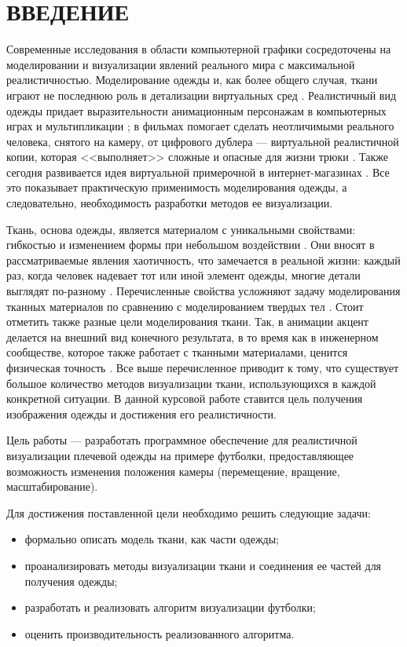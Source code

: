 \chapter*{ВВЕДЕНИЕ}

Современные исследования в области компьютерной графики сосредоточены на
моделировании и визуализации явлений реального мира с максимальной
реалистичностью. Моделирование одежды и, как более общего случая, ткани играют
не последнюю роль в детализации виртуальных сред \cite{bib01}.  Реалистичный вид
одежды придает выразительности анимационным персонажам в компьютерных играх и
мультипликации \cite{bib02}; в фильмах помогает сделать неотличимыми реального
человека, снятого на камеру, от цифрового дублера --- виртуальной реалистичной
копии, которая <<выполняет>> сложные и  опасные для жизни трюки \cite{bib03}.
Также сегодня развивается идея виртуальной примерочной в интернет-магазинах
\cite{bib04}. Все это показывает практическую применимость моделирования одежды,
а следовательно, необходимость разработки методов ее визуализации.

Ткань, основа одежды, является материалом с уникальными свойствами: гибкостью и
изменением формы при небольшом воздействии \cite{bib05}. Они вносят в
рассматриваемые явления хаотичность, что  замечается в реальной жизни: каждый
раз, когда человек надевает тот или иной элемент одежды, многие детали выглядят
по-разному \cite{bib06}.  Перечисленные свойства усложняют задачу моделирования
тканных материалов по сравнению с моделированием твердых тел \cite{bib07}.
Стоит отметить также разные цели моделирования ткани. Так, в анимации акцент
делается на внешний вид конечного результата, в то время как в инженерном
сообществе, которое также работает с тканными материалами, ценится физическая
точность \cite{bib03}. Все выше перечисленное приводит к тому, что существует
большое количество методов визуализации ткани, использующихся в каждой
конкретной ситуации. В данной курсовой работе ставится цель получения
изображения одежды и достижения его реалистичности.

Цель работы --- разработать программное обеспечение для реалистичной
визуализации плечевой одежды на примере футболки, предоставляющее возможность
изменения положения камеры (перемещение, вращение, масштабирование).

Для достижения поставленной цели необходимо решить следующие задачи:
\begin{itemize}[left=\parindent]
    \item  формально описать модель ткани, как части одежды;
    \item  проанализировать методы визуализации ткани и соединения ее частей для
        получения одежды;
    \item  разработать и реализовать алгоритм визуализации футболки;
    \item оценить производительность реализованного алгоритма.
\end{itemize}

